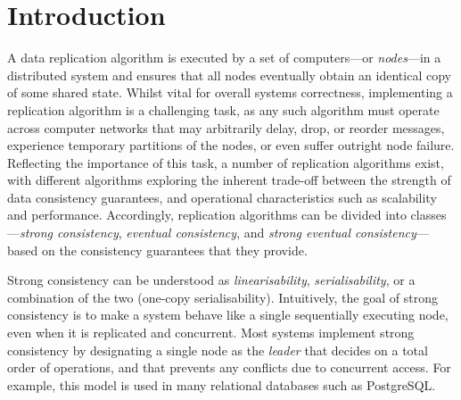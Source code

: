 \documentclass[acmlarge,review,anonymous]{acmart}\settopmatter{printfolios=true}
\begin{document}


\maketitle



\section{Introduction}
\label{sect.introduction}

A data replication algorithm is executed by a set of computers---or \emph{nodes}---in a distributed system and ensures that all nodes eventually obtain an identical copy of some shared state.
Whilst vital for overall systems correctness, implementing a replication algorithm is a challenging task, as any such algorithm must operate across computer networks that may arbitrarily delay, drop, or reorder messages, experience temporary partitions of the nodes, or even suffer outright node failure.
Reflecting the importance of this task, a number of replication algorithms exist, with different algorithms exploring the inherent trade-off between the strength of data consistency guarantees, and operational characteristics such as scalability and performance.
Accordingly, replication algorithms can be divided into classes---\emph{strong consistency}, \emph{eventual consistency}, and \emph{strong eventual consistency}---based on the consistency guarantees that they provide.

Strong consistency can be understood as \emph{linearisability}, \emph{serialisability}, or a combination of the two (one-copy serialisability).
Intuitively, the goal of strong consistency is to make a system behave like a single sequentially executing node, even when it is replicated and concurrent.
Most systems implement strong consistency by designating a single node as the \emph{leader} that decides on a total order of operations, and that prevents any conflicts due to concurrent access.
For example, this model is used in many relational databases such as PostgreSQL.
\end{document}
